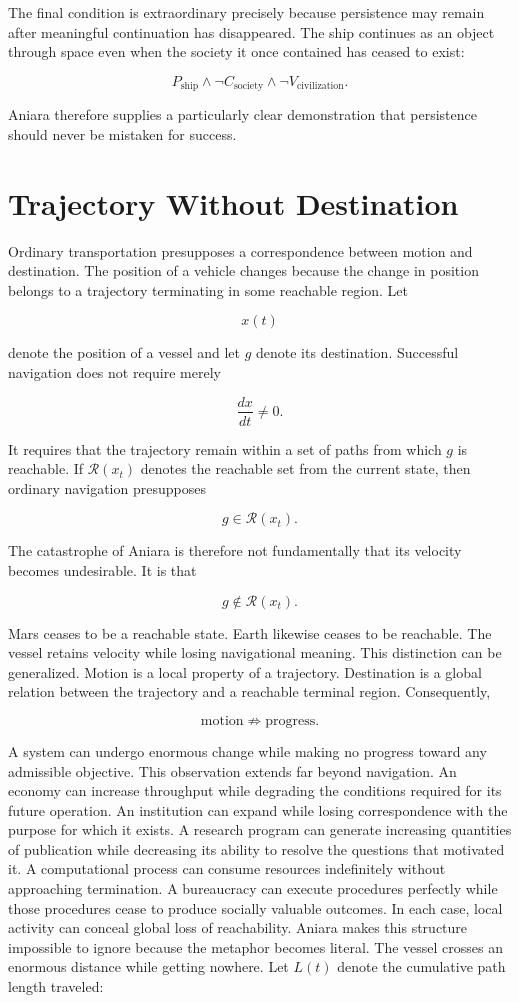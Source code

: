 \documentclass[11pt,oneside]{book}
\theoremstyle{definition}
\theoremstyle{remark}
\begin{document}
The final condition is extraordinary precisely because persistence may remain after meaningful
continuation has disappeared. The ship continues as an object through space even when the society it
once contained has ceased to exist:

\[
P_{\mathrm{ship}} \land \neg C_{\mathrm{society}} \land \neg V_{\mathrm{civilization}}.
\]

Aniara therefore supplies a particularly clear demonstration that persistence should never be
mistaken for success.

\section{Trajectory Without Destination}

Ordinary transportation presupposes a correspondence between motion and destination. The position of
a vehicle changes because the change in position belongs to a trajectory terminating in some
reachable region. Let

\[
x(t)
\]

denote the position of a vessel and let \(g\) denote its destination. Successful navigation does not
require merely

\[
\frac{dx}{dt}\neq0.
\]

It requires that the trajectory remain within a set of paths from which \(g\) is reachable. If
\(\mathcal{R}(x_t)\) denotes the reachable set from the current state, then ordinary navigation
presupposes

\[
g\in\mathcal{R}(x_t).
\]

The catastrophe of Aniara is therefore not fundamentally that its velocity becomes undesirable. It
is that

\[
g\notin\mathcal{R}(x_t).
\]

Mars ceases to be a reachable state. Earth likewise ceases to be reachable. The vessel retains
velocity while losing navigational meaning. This distinction can be generalized. Motion is a local
property of a trajectory. Destination is a global relation between the trajectory and a reachable
terminal region. Consequently,

\[
\text{motion}\not\Rightarrow\text{progress}.
\]

A system can undergo enormous change while making no progress toward any admissible objective. This
observation extends far beyond navigation. An economy can increase throughput while degrading the
conditions required for its future operation. An institution can expand while losing correspondence
with the purpose for which it exists. A research program can generate increasing quantities of
publication while decreasing its ability to resolve the questions that motivated it. A computational
process can consume resources indefinitely without approaching termination. A bureaucracy can
execute procedures perfectly while those procedures cease to produce socially valuable outcomes. In
each case, local activity can conceal global loss of reachability. Aniara makes this structure
impossible to ignore because the metaphor becomes literal. The vessel crosses an enormous distance
while getting nowhere. Let \(L(t)\) denote the cumulative path length traveled:
\end{document}
